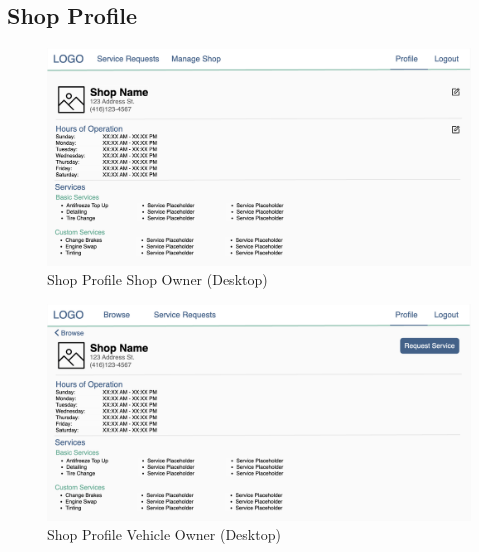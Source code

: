 \documentclass[12pt, titlepage]{article}
\begin{document}
\subsection{Shop Profile}

\begin{figure}[H]
	\centering
	\includegraphics[width=\textwidth]{mockups/Shop Profile (Shop Owner) (Desktop).png}
	\caption{Shop Profile \textemdash{} Shop Owner (Desktop)}
\end{figure}

\begin{figure}[H]
	\centering
	\includegraphics[width=\textwidth]{mockups/Shop Profile (Vehicle Owner) (Desktop).png}
	\caption{Shop Profile \textemdash{} Vehicle Owner (Desktop)}
\end{figure}
\end{document}
